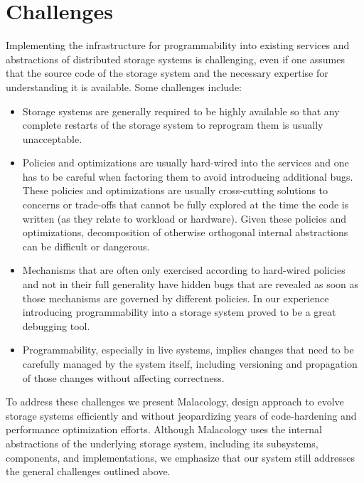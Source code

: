 \section{Challenges}
\label{sec:challenges}

Implementing the infrastructure for programmability into existing services and
abstractions of distributed storage systems is challenging, even if one assumes
that the source code of the storage system and the necessary expertise for
understanding it is available.  Some challenges include:

\begin{itemize}

\item Storage systems are generally required to be highly available so that any
complete restarts of the storage system to reprogram them is usually
unacceptable.

\item Policies and optimizations are usually hard-wired into the services and
one has to be careful when factoring them to avoid introducing additional bugs.
These policies and optimizations are usually cross-cutting solutions to
concerns or trade-offs that cannot be fully explored at the time the code is
written (as they relate to workload or hardware). Given these policies and
optimizations, decomposition of otherwise orthogonal internal abstractions can
be difficult or dangerous.

\item Mechanisms that are often only exercised according to hard-wired policies
and not in their full generality have hidden bugs that are revealed as soon as
those mechanisms are governed by different policies. In our experience
introducing programmability into a storage system proved to be a great
debugging tool.

\item Programmability, especially in live systems, implies changes that need to
be carefully managed by the system itself, including versioning and propagation
of those changes without affecting correctness.

\end{itemize}

To address these challenges we present Malacology, 
 design approach to evolve storage systems efficiently and
without jeopardizing years of code-hardening and performance optimization
efforts.  Although Malacology uses the internal abstractions of the underlying
storage system, including its subsystems, components, and implementations, we
emphasize that our system still addresses the general challenges outlined
above.

